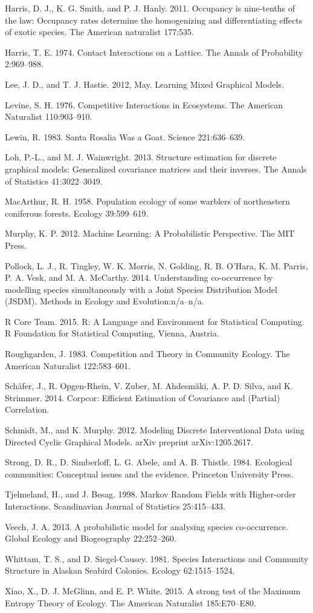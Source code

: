 \documentclass[12pt,]{article}
\begin{document}
\begin{spacing}{1.9}
\begin{flushleft}
Harris, D. J., K. G. Smith, and P. J. Hanly. 2011. Occupancy is
nine-tenths of the law: Occupancy rates determine the homogenizing and
differentiating effects of exotic species. The American naturalist
177:535.

Harris, T. E. 1974. Contact Interactions on a Lattice. The Annals of
Probability 2:969--988.

Lee, J. D., and T. J. Hastie. 2012, May. Learning Mixed Graphical
Models.

Levine, S. H. 1976. Competitive Interactions in Ecosystems. The American
Naturalist 110:903--910.

Lewin, R. 1983. Santa Rosalia Was a Goat. Science 221:636--639.

Loh, P.-L., and M. J. Wainwright. 2013. Structure estimation for
discrete graphical models: Generalized covariance matrices and their
inverses. The Annals of Statistics 41:3022--3049.

MacArthur, R. H. 1958. Population ecology of some warblers of
northeastern coniferous forests. Ecology 39:599--619.

Murphy, K. P. 2012. Machine Learning: A Probabilistic Perspective. The
MIT Press.

Pollock, L. J., R. Tingley, W. K. Morris, N. Golding, R. B. O'Hara, K.
M. Parris, P. A. Vesk, and M. A. McCarthy. 2014. Understanding
co-occurrence by modelling species simultaneously with a Joint Species
Distribution Model (JSDM). Methods in Ecology and Evolution:n/a--n/a.

R Core Team. 2015. R: A Language and Environment for Statistical
Computing. R Foundation for Statistical Computing, Vienna, Austria.

Roughgarden, J. 1983. Competition and Theory in Community Ecology. The
American Naturalist 122:583--601.

Schäfer, J., R. Opgen-Rhein, V. Zuber, M. Ahdesmäki, A. P. D. Silva, and
K. Strimmer. 2014. Corpcor: Efficient Estimation of Covariance and
(Partial) Correlation.

Schmidt, M., and K. Murphy. 2012. Modeling Discrete Interventional Data
using Directed Cyclic Graphical Models. arXiv preprint arXiv:1205.2617.

Strong, D. R., D. Simberloff, L. G. Abele, and A. B. Thistle. 1984.
Ecological communities: Conceptual issues and the evidence. Princeton
University Press.

Tjelmeland, H., and J. Besag. 1998. Markov Random Fields with
Higher-order Interactions. Scandinavian Journal of Statistics
25:415--433.

Veech, J. A. 2013. A probabilistic model for analysing species
co-occurrence. Global Ecology and Biogeography 22:252--260.

Whittam, T. S., and D. Siegel-Causey. 1981. Species Interactions and
Community Structure in Alaskan Seabird Colonies. Ecology 62:1515--1524.

Xiao, X., D. J. McGlinn, and E. P. White. 2015. A strong test of the
Maximum Entropy Theory of Ecology. The American Naturalist 185:E70--E80.
\end{flushleft}
\end{spacing}
\end{document}
